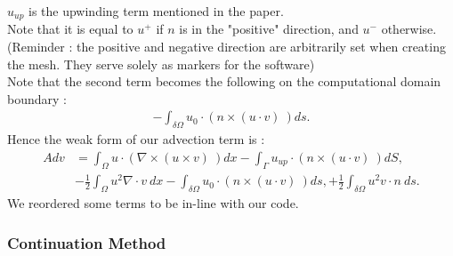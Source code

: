 \documentclass[11pt,twoside,a4paper]{article}
\begin{document}
$u_{up}$ is the upwinding term mentioned in the paper.\\
Note that it is equal to $u^+$ if $n$ is in the "positive" direction, and $u^-$ otherwise. (Reminder : the positive and negative direction are arbitrarily set when creating the mesh. They serve solely as markers for the software)\\
Note that the second term becomes the following on the computational domain boundary :
\begin{align*}
- \int_{\delta \Omega} u_0 \cdot (n \times (u \cdot v) \ ) ds .
\end{align*}
Hence the weak form of our advection term is :
\begin{align}
 Adv &= \int_\Omega u \cdot (\nabla \times (u \times v) \ ) dx - \int_{\Gamma} u_{up} \cdot (n \times (u \cdot v) \ ) dS , \\
&- \frac{1}{2} \int_\Omega u^2 \nabla \cdot v \ dx - \int_{\delta \Omega} u_0 \cdot (n \times (u \cdot v) \ ) ds ,
+ \frac{1}{2} \int_{\delta \Omega } u^2 v \cdot n \ ds .
\end{align}
We reordered some terms to be in-line with our code.

\subsubsection{Continuation Method}
\end{document}
